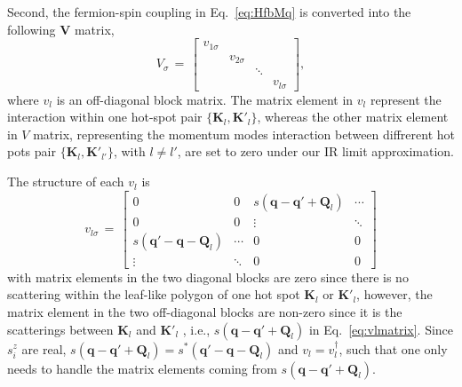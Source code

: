 \documentclass[aps,prx,twocolumn,superscriptaddress,showpacs,floatfix]{revtex4-1}
\begin{document}
Second, the fermion-spin coupling in Eq.~\eqref{eq:HfbMq} is converted into the following $\mathbf V$ matrix,
\begin{equation}
V_{\sigma}\,=\,\left[\begin{array}{cccc}
v_{1\sigma}\\
 & v_{2\sigma}\\
 &  & \ddots\\
 &  &  & v_{l\sigma}
\end{array}\right],
\label{eq:Vmatrix}
\end{equation}
where $v_{l}$ is an off-diagonal block matrix. The matrix element in $v_{l}$ represent the interaction within one hot-spot pair $\{\mathbf{K}_{l}, \mathbf{K'}_{l}\}$, whereas the other matrix element in $V$ matrix, representing the momentum modes interaction between diffrerent hot pots pair $\{\mathbf{K}_{l}, \mathbf{K'}_{l'}\}$, with $l \neq l'$, are set to zero under our IR limit approximation.

The structure of each $v_{l}$ is
\begin{equation}
v_{l\sigma}\,=\,\begin{bmatrix}0 & 0 & s(\mathbf{q}-\mathbf{q}'+\mathbf{Q}_{l}) & \cdots\\
0 & 0 & \vdots & \ddots\\
s(\mathbf{q}'-\mathbf{q}-\mathbf{Q}_{l}) & \cdots & 0 & 0\\
\vdots & \ddots & 0 & 0
\end{bmatrix}
\label{eq:vlmatrix}
\end{equation}
with matrix elements in the two diagonal blocks are zero since there is no scattering within the leaf-like polygon of one hot spot $\mathbf{K}_{l}$ or $\mathbf{K'}_{l}$, however, the matrix element in the two off-diagonal blocks are non-zero since it is the scatterings between $\mathbf{K}_{l}$ and $\mathbf{K'}_{l}$ , i.e., $s(\mathbf{q}-\mathbf{q'}+\mathbf{Q}_{l})$ in Eq.~\eqref{eq:vlmatrix}. Since $s_i^z$ are real, $s(\mathbf{q}-\mathbf{q}'+\mathbf{Q}_{l})=s^{*}(\mathbf{q}'-\mathbf{q}-\mathbf{Q}_{l})$ and $v_{l}=v_{l}^{\dagger}$, such that one only needs to handle the matrix elements coming from $s(\mathbf{q}-\mathbf{q}'+\mathbf{Q}_{l})$.
\end{document}
